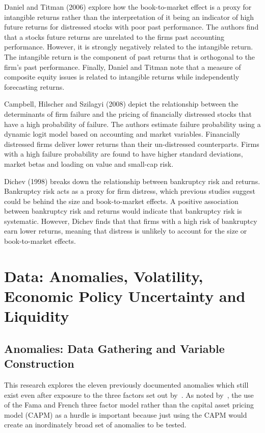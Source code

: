 \documentclass[a4paper]{article}                 %
\begin{document}
Daniel and Titman (2006) explore how the book-to-market effect is a proxy for intangible returns rather than the interpretation of it being an indicator of high future returns for distressed stocks with poor past performance. The authors find that a stocks future returns are unrelated to the firms past accounting performance. However, it is strongly negatively related to the intangible return. The intangible return is the component of past returns that is orthogonal to the firm’s past performance. Finally, Daniel and Titman note that a measure of composite equity issues is related to intangible returns while independently forecasting returns. 

Campbell, Hilscher and Szilagyi (2008) depict the relationship between the determinants of firm failure and the pricing of financially distressed stocks that have a high probability of failure. The authors estimate failure probability using a dynamic logit model based on accounting and market variables. Financially distressed firms deliver lower returns than their un-distressed counterparts. Firms with a high failure probability are found to have higher standard deviations, market betas and loading on value and small-cap risk. 

Dichev (1998) breaks down the relationship between bankruptcy risk and returns. Bankruptcy risk acts as a proxy for firm distress, which previous studies suggest could be behind the size and book-to-market effects. A positive association between bankruptcy risk and returns would indicate that bankruptcy risk is systematic. However, Dichev finds that that firms with a high risk of bankruptcy earn lower returns, meaning that distress is unlikely to account for the size or book-to-market effects. 

\section{Data: Anomalies, Volatility, Economic Policy Uncertainty and Liquidity}
\subsection{Anomalies: Data Gathering and Variable Construction}
This research explores the eleven previously documented anomalies which still exist even after exposure to the three factors set out by~\cite{fama1993common}. As noted by~\cite{stambaugh2012short}, the use of the Fama and French three factor model rather than the capital asset pricing model (CAPM) as a hurdle is important because just using the CAPM would create an inordinately broad set of anomalies to be tested. 
\end{document}
